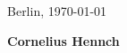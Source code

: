 \documentclass[11pt, a4paper, roman]{moderncv}        %
\begin{document}

Berlin, \today\vspace{32pt}

\textbf{Cornelius Hennch}


\clearpage

\end{document}
